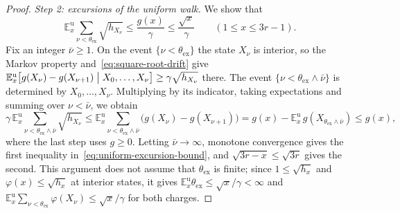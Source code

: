 \begin{proof}
\emph{Step 2: excursions of the uniform walk.} We show that
\begin{equation}\label{eq:uniform-excursion-bound}
 \mathbb E^{\mathrm u}_x\sum_{\nu<\theta_{\mathrm{ex}}}\sqrt{h_{X_\nu}}
 \le\frac{g(x)}\gamma\le\frac{\sqrt x}\gamma
 \qquad(1\le x\le3r-1).
\end{equation}
Fix an integer \(\bar\nu\ge1\). On the event
\(\{\nu<\theta_{\mathrm{ex}}\}\) the state \(X_\nu\) is interior, so the
Markov property and~\eqref{eq:square-root-drift} give
\(\mathbb E^{\mathrm u}_x\bigl[g(X_\nu)-g(X_{\nu+1})\bigm|X_0,\ldots,X_\nu\bigr]
\ge\gamma\sqrt{h_{X_\nu}}\) there. The event
\(\{\nu<\theta_{\mathrm{ex}}\wedge\bar\nu\}\) is determined by
\(X_0,\ldots,X_\nu\). Multiplying by its indicator, taking expectations
and summing over \(\nu<\bar\nu\), we obtain
\[
 \gamma\,\mathbb E^{\mathrm u}_x\sum_{\nu<\theta_{\mathrm{ex}}\wedge\bar\nu}\sqrt{h_{X_\nu}}
 \le\mathbb E^{\mathrm u}_x\sum_{\nu<\theta_{\mathrm{ex}}\wedge\bar\nu}
   \bigl(g(X_\nu)-g(X_{\nu+1})\bigr)
 =g(x)-\mathbb E^{\mathrm u}_x\,g(X_{\theta_{\mathrm{ex}}\wedge\bar\nu})\le g(x),
\]
where the last step uses \(g\ge0\). Letting \(\bar\nu\to\infty\),
monotone convergence gives the first inequality
in~\eqref{eq:uniform-excursion-bound}, and \(\sqrt{3r-x}\le\sqrt{3r}\)
gives the second. This argument does not assume that
\(\theta_{\mathrm{ex}}\) is finite; since \(1\le\sqrt{h_x}\) and
\(\varphi(x)\le\sqrt{h_x}\) at interior states, it gives
\(\mathbb E^{\mathrm u}_x\theta_{\mathrm{ex}}\le\sqrt x/\gamma<\infty\)
and \(\mathbb E^{\mathrm u}_x\sum_{\nu<\theta_{\mathrm{ex}}}\varphi(X_\nu)\le\sqrt x/\gamma\)
for both charges.


\end{proof}
